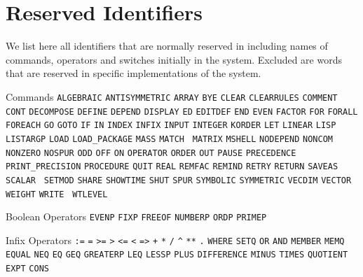 \appendix
\chapter{Reserved Identifiers}

We list here all identifiers that are normally reserved in \REDUCE{}
including names of commands, operators and switches initially in the system.
Excluded are words that are reserved in specific implementations of the
system.

\vspace{13pt}
\begin{list}{}{\renewcommand{\makelabel}[1]{#1\hspace{\fill}}%
               \settowidth{\labelwidth}{Numerical Operators}%
               \setlength{\labelsep}{1em}%
	       \sloppy}

\item[Commands] {\tt ALGEBRAIC} {\tt ANTISYMMETRIC}
{\tt ARRAY} {\tt BYE} {\tt CLEAR} \linebreak
{\tt CLEARRULES} {\tt COMMENT} {\tt
CONT} {\tt DECOMPOSE} {\tt DEFINE} {\tt DEPEND} {\tt DISPLAY} {\tt ED}
{\tt EDITDEF} {\tt END} {\tt EVEN} {\tt FACTOR} {\tt FOR} {\tt FORALL}
{\tt FOREACH} {\tt GO} {\tt GOTO} {\tt IF} {\tt IN} {\tt INDEX} {\tt INFIX}
{\tt INPUT} {\tt INTEGER} {\tt KORDER} {\tt LET} {\tt LINEAR} {\tt LISP}
{\tt LISTARGP} {\tt LOAD} {\tt LOAD\_PACKAGE} {\tt MASS} {\tt MATCH} {\tt
MATRIX} {\tt MSHELL} {\tt NODEPEND} {\tt NONCOM} {\tt NONZERO} {\tt NOSPUR}
{\tt ODD} {\tt OFF}
{\tt ON} {\tt OPERATOR} {\tt ORDER} {\tt OUT} {\tt PAUSE} {\tt PRECEDENCE}
{\tt PRINT\_PRECISION} {\tt PROCEDURE} {\tt QUIT} {\tt REAL} {\tt REMFAC}
{\tt REMIND} {\tt RETRY} {\tt RETURN} {\tt SAVEAS} {\tt SCALAR} {\tt
SETMOD} {\tt SHARE} {\tt SHOWTIME} {\tt SHUT} {\tt SPUR} {\tt SYMBOLIC}
{\tt SYMMETRIC} {\tt VECDIM} {\tt VECTOR} {\tt WEIGHT} {\tt WRITE} {\tt
WTLEVEL}

\item[Boolean Operators] {\tt EVENP} {\tt FIXP}
{\tt FREEOF} {\tt NUMBERP} {\tt ORDP} {\tt PRIMEP}

\item[Infix Operators]
 \verb|:=| \verb|=| \verb|>=| \verb|>| \verb|<=| \verb|<| \verb|=>|
 \verb|+| \verb|*| \verb|/| \verb|^| \verb|**| \verb|.| {\tt WHERE}
{\tt SETQ} {\tt OR} {\tt AND} {\tt MEMBER} {\tt MEMQ} {\tt
EQUAL} {\tt NEQ} {\tt EQ} {\tt GEQ} {\tt GREATERP} {\tt LEQ} {\tt LESSP}
{\tt PLUS} {\tt DIFFERENCE} {\tt MINUS} {\tt TIMES} {\tt QUOTIENT} {\tt
EXPT} {\tt CONS}


\end{list}
